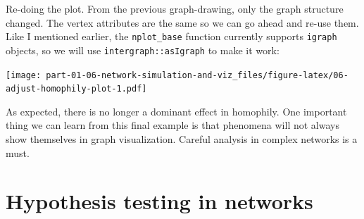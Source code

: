 \documentclass[]{book}
\newenvironment{Shaded}{\begin{snugshade}}{\end{snugshade}}
\newcommand{\CommentTok}[1]{\textcolor[rgb]{0.56,0.35,0.01}{\textit{#1}}}
\newcommand{\DataTypeTok}[1]{\textcolor[rgb]{0.13,0.29,0.53}{#1}}
\newcommand{\DecValTok}[1]{\textcolor[rgb]{0.00,0.00,0.81}{#1}}
\newcommand{\KeywordTok}[1]{\textcolor[rgb]{0.13,0.29,0.53}{\textbf{#1}}}
\newcommand{\NormalTok}[1]{#1}
\newcommand{\OperatorTok}[1]{\textcolor[rgb]{0.81,0.36,0.00}{\textbf{#1}}}
\newcommand{\StringTok}[1]{\textcolor[rgb]{0.31,0.60,0.02}{#1}}
\begin{document}
Re-doing the plot. From the previous graph-drawing, only the graph structure
changed. The vertex attributes are the same so we can go ahead and re-use them.
Like I mentioned earlier, the \texttt{nplot\_base} function currently supports \texttt{igraph}
objects, so we will use \texttt{intergraph::asIgraph} to make it work:

\begin{Shaded}
\end{Shaded}

\texttt{[image: part-01-06-network-simulation-and-viz\_files/figure-latex/06-adjust-homophily-plot-1.pdf]}

As expected, there is no longer a dominant effect in homophily. One important
thing we can learn from this final example is that phenomena will not always
show themselves in graph visualization. Careful analysis in complex networks
is a must.

\hypertarget{hypothesis-testing-in-networks}{%
\chapter{Hypothesis testing in networks}\label{hypothesis-testing-in-networks}}
\end{document}
